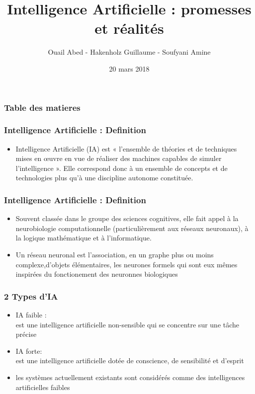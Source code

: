 \documentclass{beamer}
\title{Intelligence Artificielle : promesses et réalités}
\author{Ouail Abed - Hakenholz Guillaume - Soufyani Amine}
\date{20 mars 2018}
\begin{document}
	\begin{frame}
	\titlepage
	\end{frame}
	
	\begin{frame} %
	\frametitle{Table des matieres}
	\tableofcontents[hideallsubsections] %
	\end{frame}

	
	\begin{frame}[fragile]
	\frametitle{Intelligence Artificielle : Definition}
	\begin{itemize}
		\item Intelligence Artificielle (IA) est « l'ensemble de théories et de techniques mises en œuvre en vue de réaliser des machines capables de simuler l'intelligence ». Elle correspond donc à un ensemble 	de concepts et de technologies plus qu'à une discipline autonome constituée.
	\end{itemize}
	\end{frame}
	
	\begin{frame}[fragile]
	\frametitle{Intelligence Artificielle : Definition}
	\begin{itemize}
		\itemsep2em
		\item Souvent classée dans le groupe des sciences cognitives, elle fait appel à la neurobiologie 					computationnelle (particulièrement aux réseaux neuronaux), à la logique mathématique et à 							l'informatique. 
		
		\item Un réseau neuronal est l’association, en un graphe plus ou moins 															complexe,d’objets élémentaires, les neurones formels qui sont eux mêmes inspirées du fonctionement 		des neuronnes biologiques
	\end{itemize}
	\end{frame}
	
	
	\begin{frame}[fragile]
	\frametitle{2 Types d'IA}
	\begin{itemize}
		\itemsep0.5em
		\item IA faible  :\\
		est une intelligence artificielle non-sensible qui se concentre sur une tâche précise
		 
		 \item IA forte: \\
		est une intelligence artificielle dotée de conscience, de sensibilité et d'esprit
		\item les systèmes actuellement existants sont considérés comme des intelligences artificielles faibles
	\end{itemize}
	\end{frame}
	
\end{document}
